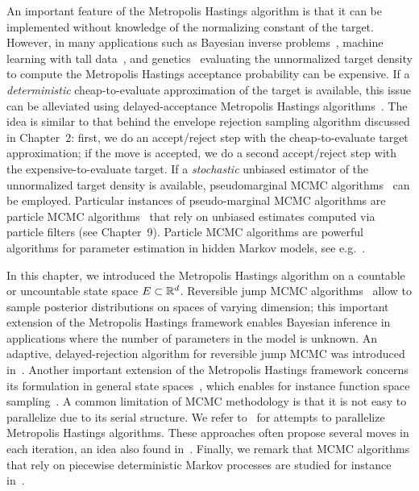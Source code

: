 An important feature of the Metropolis Hastings algorithm is that it can be implemented
without knowledge of the normalizing constant of the target. However, in many applications
such as Bayesian inverse problems~\cite{219}, machine learning with tall data~\cite{16}, and genetics~\cite{17}
evaluating the unnormalized target density to compute the Metropolis Hastings acceptance
probability can be expensive. If a \textit{deterministic} cheap-to-evaluate approximation of the target is
available, this issue can be alleviated using delayed-acceptance Metropolis Hastings algorithms~\cite{50,69,68,212}. The idea is similar to that behind the envelope rejection sampling algorithm
discussed in Chapter~2: first, we do an accept/reject step with the cheap-to-evaluate target approximation; if the move is accepted, we do a second accept/reject step with the expensive-to-evaluate
target. If a \textit{stochastic} unbiased estimator of the unnormalized target density is available, pseudomarginal MCMC algorithms~\cite{17,12} can be employed. Particular instances of pseudo-marginal
MCMC algorithms are particle MCMC algorithms~\cite{10} that rely on unbiased estimates computed via particle filters (see Chapter~9). Particle MCMC algorithms are powerful algorithms for
parameter estimation in hidden Markov models, see e.g.~\cite{93}.

In this chapter, we introduced the Metropolis Hastings algorithm on a countable or uncountable state space $E \subset \mathbb{R}^d$. Reversible jump MCMC algorithms~\cite{96} allow to sample posterior
distributions on spaces of varying dimension; this important extension of the Metropolis Hastings framework enables Bayesian inference in applications where the number of parameters in
the model is unknown. An adaptive, delayed-rejection algorithm for reversible jump MCMC was
introduced in~\cite{97}. Another important extension of the Metropolis Hastings framework concerns
its formulation in general state spaces~\cite{226,199}, which enables for instance function space sampling~\cite{52}. A common limitation of MCMC methodology is that it is not easy to parallelize due
to its serial structure. We refer to~\cite{41,91,211} for attempts to parallelize Metropolis Hastings
algorithms. These approaches often propose several moves in each iteration, an idea also found
in~\cite{147}. Finally, we remark that MCMC algorithms that rely on piecewise deterministic Markov
processes are studied for instance in~\cite{74,25,32}.
